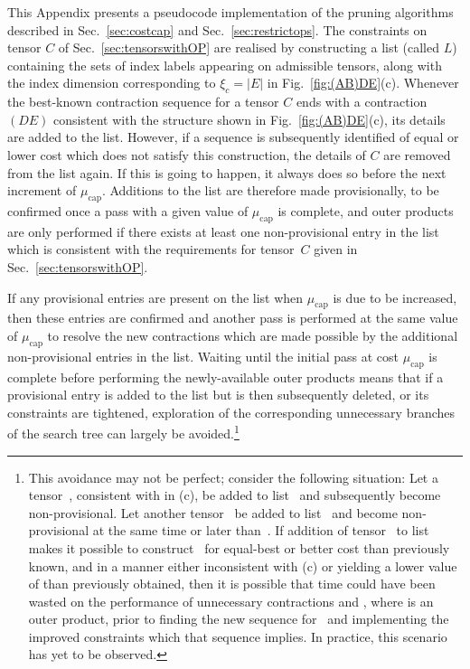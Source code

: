 \documentclass[aps,pre,reprint,superscriptaddress,amsfonts,amsmath,showpacs,nofootinbib,floatfix]{revtex4-1}
\newcommand{\mrm}[1]{\mathrm{#1}}
\newcommand{\fref}[1]{Fig.~\ref{#1}}
\newcommand{\sref}[1]{Sec.~\ref{#1}}
\newcommand{\pfref}[1]{\protect{Fig.~\ref{#1}}}
\newcommand{\xc}{\xi_c}
\begin{document}
This Appendix presents a pseudocode implementation of the pruning algorithms described in \sref{sec:costcap} and \sref{sec:restrictops}. The constraints on tensor $C$ of \sref{sec:tensorswithOP} are realised by constructing a list (called $L$) containing the sets of index labels appearing on admissible tensors, along with the index dimension corresponding to $\xc=|E|$ in \fref{fig:(AB)DE}(c). 
Whenever the best-known contraction sequence for a tensor $C$ ends with a contraction $(DE)$ consistent with the structure shown in \fref{fig:(AB)DE}(c), its details are added to the list. However, if a sequence is subsequently identified of equal or lower cost which does not satisfy this construction, the details of $C$ are removed from the list again. If this is going to happen, it always does so before the next increment of $\mu_\mrm{cap}$. Additions to the list are therefore made provisionally, to be confirmed once a pass with a given value of $\mu_\mrm{cap}$ is complete,
and 
outer products are only performed if there exists at least one non-provisional entry in the list which is consistent with the requirements for tensor~$C$ given in \sref{sec:tensorswithOP}.


If any provisional entries are present on the list when $\mu_\mrm{cap}$ is due to be increased, then these entries are confirmed and another pass is performed at the same value of $\mu_\mrm{cap}$ to resolve the new contractions which are made possible by the additional non-provisional entries in the list. Waiting until the initial pass at cost $\mu_\mrm{cap}$ is complete before performing the newly-available outer products means that if a provisional entry is added to the list but is then subsequently deleted, or its constraints are tightened, exploration of the corresponding unnecessary branches of the search tree can largely be avoided.\footnote{This avoidance may not be perfect; consider the following situation: Let a tensor~, consistent with  in \pfref{fig:(AB)DE}(c), be added to list~ and subsequently become non-provisional. Let another tensor~ be added to list~ and become non-provisional at the same time or later than~. If addition of tensor~ to list~ makes it possible to construct~ for equal-best or better cost than previously known, and in a manner either inconsistent with \pfref{fig:(AB)DE}(c) or yielding a lower value of \protect{$\xc$} than previously obtained, then it is possible that time could have been wasted on the performance of unnecessary contractions  and , where  is an outer product, prior to finding the new sequence for~ and implementing the improved constraints which that sequence implies. In practice, this scenario has yet to be observed.}
\end{document}
